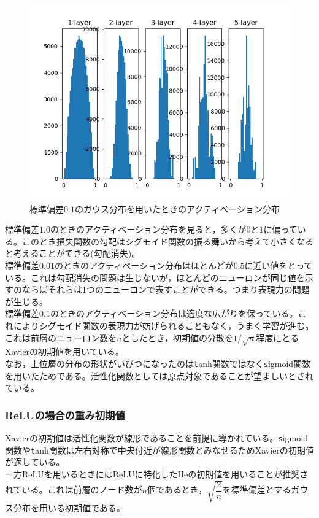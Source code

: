 \documentclass{jarticle}
\begin{document}
\begin{figure}[htbp]
	\begin{center}
		\includegraphics[scale = 0.5]{histogram3.png}
		\caption{標準偏差$0.1$のガウス分布を用いたときのアクティベーション分布}
		\label{histogram3}
	\end{center}
\end{figure}
標準偏差$1.0$のときのアクティベーション分布を見ると，多くが$0$と$1$に偏っている。このとき損失関数の勾配はシグモイド関数の振る舞いから考えて小さくなると考えることができる(勾配消失)。\\
標準偏差$0.01$のときのアクティベーション分布はほとんどが$0.5$に近い値をとっている。これは勾配消失の問題は生じないが，ほとんどのニューロンが同じ値を示すのならばそれらは1つのニューロンで表すことができる。つまり表現力の問題が生じる。\\
標準偏差$0.1$のときのアクティベーション分布は適度な広がりを保っている。これによりシグモイド関数の表現力が妨げられることもなく，うまく学習が進む。これは前層のニューロン数を$n$としたとき，初期値の分散を$1/\sqrt n$程度にとるXavierの初期値を用いている。\\
なお，上位層の分布の形状がいびつになったのは{\texttt tanh}関数ではなく{\texttt sigmoid}関数を用いたためである。活性化関数としては原点対象であることが望ましいとされている。

\subsubsection{ReLUの場合の重み初期値}
Xavierの初期値は活性化関数が線形であることを前提に導かれている。{\texttt sigmoid}関数や{\texttt tanh}関数は左右対称で中央付近が線形関数とみなせるためXavierの初期値が適している。\\
一方ReLUを用いるときにはReLUに特化したHeの初期値を用いることが推奨されている。これは前層のノード数が$n$個であるとき，$\sqrt{\dfrac{2}{n}}$を標準偏差とするガウス分布を用いる初期値である。
\end{document}
